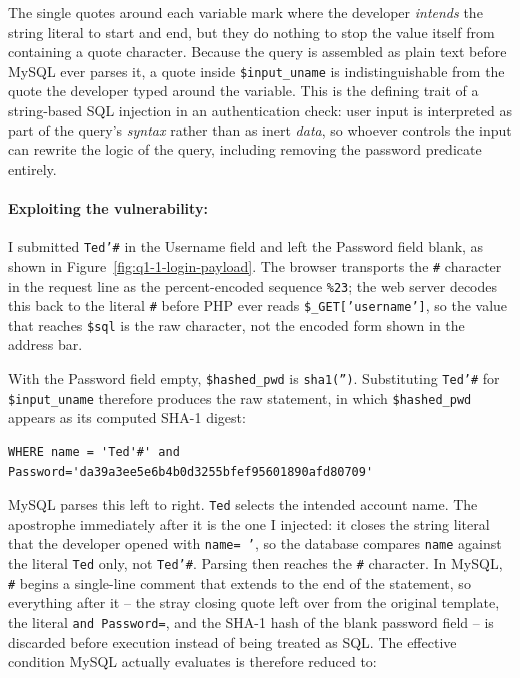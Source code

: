 The single quotes around each variable mark where the developer
\emph{intends} the string literal to start and end, but they do nothing to
stop the value itself from containing a quote character. Because the query is
assembled as plain text before MySQL ever parses it, a quote inside
\texttt{\$input\_uname} is indistinguishable from the quote the developer
typed around the variable. This is the defining trait of a string-based SQL
injection in an authentication check: user input is interpreted as part of
the query's \emph{syntax} rather than as inert \emph{data}, so whoever
controls the input can rewrite the logic of the query, including removing the
password predicate entirely.

\paragraph{Exploiting the vulnerability:} I submitted \texttt{Ted'\#} in the
Username field and left the Password field blank, as shown in
Figure~\ref{fig:q1-1-login-payload}. The browser transports the \texttt{\#}
character in the request line as the percent-encoded sequence \texttt{\%23};
the web server decodes this back to the literal \texttt{\#} before PHP ever
reads \texttt{\$\_GET['username']}, so the value that reaches \texttt{\$sql}
is the raw character, not the encoded form shown in the address bar.


With the Password field empty, \texttt{\$hashed\_pwd} is \texttt{sha1('')}.
Substituting \texttt{Ted'\#} for \texttt{\$input\_uname} therefore produces
the raw statement, in which \texttt{\$hashed\_pwd} appears as its computed
SHA-1 digest:

\begin{lstlisting}[language={[MySQL]SQL}]
WHERE name = 'Ted'#' and Password='da39a3ee5e6b4b0d3255bfef95601890afd80709'
\end{lstlisting}

MySQL parses this left to right. \texttt{Ted} selects the intended account
name. The apostrophe immediately after it is the one I injected: it closes
the string literal that the developer opened with \texttt{name= '}, so the
database compares \texttt{name} against the literal \texttt{Ted} only, not
\texttt{Ted'\#}. Parsing then reaches the \texttt{\#} character. In MySQL,
\texttt{\#} begins a single-line comment that extends to the end of the
statement, so everything after it -- the stray closing quote left over from
the original template, the literal \texttt{and Password=}, and the SHA-1 hash
of the blank password field -- is discarded before execution instead of being
treated as SQL. The effective condition MySQL actually evaluates is therefore
reduced to:

